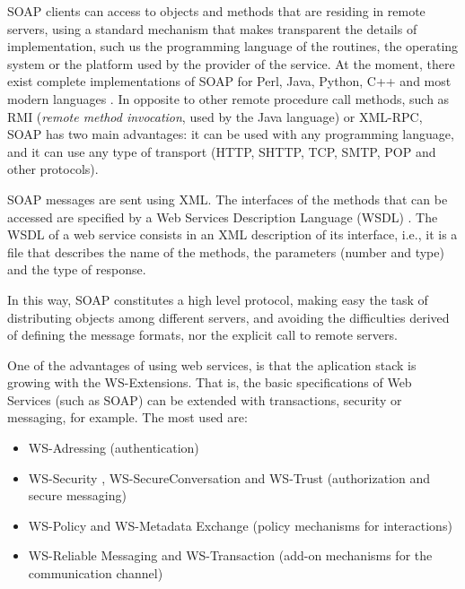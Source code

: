 \documentclass[final,1p,times]{elsarticle}
\begin{document}
SOAP clients can access to objects and methods that are residing in remote servers, using a standard mechanism that makes transparent the details of implementation, such us the programming language of the
routines, the operating system or the platform used by the provider of the service. 
At the moment, there exist complete implementations of SOAP for Perl, Java, Python, C++ and most modern languages \cite{SOAP:soft}.
In opposite to other remote procedure call methods, such as RMI (\emph{remote method invocation}, used by the Java language) or XML-RPC, SOAP has two main advantages: it can be used with any programming language, and it can use any type of transport (HTTP, SHTTP, TCP, SMTP, POP and other protocols).

SOAP messages are sent using XML. %
The interfaces of the methods that can be accessed are specified by a Web Services Description Language (WSDL) \cite{Alonso2010}. %
The WSDL of a web service consists in an XML description of its interface, i.e., it is a file that describes the name of the methods, the parameters (number and type) and the type of response.

In this way, SOAP constitutes a high level protocol, making easy the task of distributing objects among different servers, and avoiding the difficulties derived of defining the message formats, nor the explicit call to remote servers.


One of the advantages of using web services, is that the aplication stack is growing with the WS-Extensions. That is, the basic specifications of Web Services (such as SOAP) can be extended with transactions, security or messaging, for example. The most used are:
\begin{itemize}
  \item WS-Adressing \cite{WSA} (authentication)
  \item WS-Security \cite{WSS}, WS-SecureConversation \cite{WSSC} and WS-Trust \cite{WSTrust} (authorization and secure messaging)
  \item WS-Policy and WS-Metadata Exchange \cite{WSP} (policy mechanisms for interactions)
  \item WS-Reliable Messaging \cite{WSR} and WS-Transaction \cite{WST} (add-on mechanisms for the communication channel)
\end{itemize}
\end{document}

